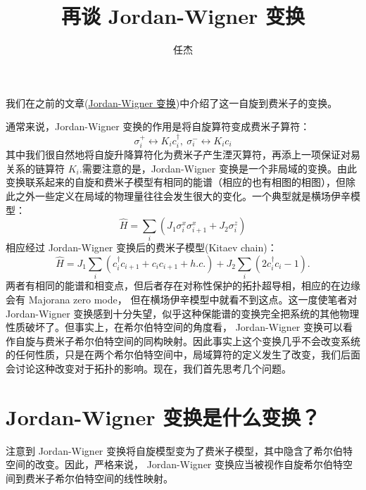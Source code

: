 \documentclass[10pt,UTF8]{ctexart}
\begin{document}
\title{再谈 Jordan-Wigner 变换}
\date{任杰}

\maketitle

\noindent 我们在之前的文章(\href{https://zhuanlan.zhihu.com/p/59368209}{Jordan-Wigner 变换})中介绍了这一自旋到费米子的变换。

\noindent 通常来说，Jordan-Wigner 变换的作用是将自旋算符变成费米子算符：
\begin{equation}
	\sigma_{i}^{+}\leftrightarrow K_{i}c_{i}^{\dagger},\ \sigma_{i}^{-}\leftrightarrow K_{i}c_{i}
\end{equation}
其中我们很自然地将自旋升降算符化为费米子产生湮灭算符，再添上一项保证对易关系的链算符 $K_{i}$.需要注意的是，Jordan-Wigner 变换是一个非局域的变换。由此变换联系起来的自旋和费米子模型有相同的能谱（相应的也有相图的相图），但除此之外一些定义在局域的物理量往往会发生很大的变化。一个典型就是横场伊辛模型：
\begin{equation}
	\hat{H}=\sum_{i}\left(J_{1}\sigma_{i}^{x}\sigma_{i+1}^{x}+J_{2}\sigma_{i}^{z}\right)
\end{equation}
相应经过 Jordan-Wigner 变换后的费米子模型(Kitaev chain)：
\begin{equation}
	\hat{H}=J_{1}\sum_{i}\left(c_{i}^{\dagger}c_{i+1}+c_{i}c_{i+1}+h.c.\right)+J_{2}\sum_{i}\left(2c_{i}^{\dagger}c_{i}-1\right).
\end{equation}
两者有相同的能谱和相变点，但后者存在对称性保护的拓扑超导相，相应的在边缘会有 Majorana zero mode， 但在横场伊辛模型中就看不到这点。这一度使笔者对 Jordan-Wigner 变换感到十分失望，似乎这种保能谱的变换完全把系统的其他物理性质破坏了。但事实上，在希尔伯特空间的角度看， Jordan-Wigner 变换可以看作自旋与费米子希尔伯特空间的同构映射。因此事实上这个变换几乎不会改变系统的任何性质，只是在两个希尔伯特空间中，局域算符的定义发生了改变，我们后面会讨论这种改变对于拓扑的影响。现在，我们首先思考几个问题。

\section*{ Jordan-Wigner  变换是什么变换？}
\noindent 注意到 Jordan-Wigner 变换将自旋模型变为了费米子模型，其中隐含了希尔伯特空间的改变。因此，严格来说， Jordan-Wigner 变换应当被视作自旋希尔伯特空间到费米子希尔伯特空间的线性映射。
\end{document}
